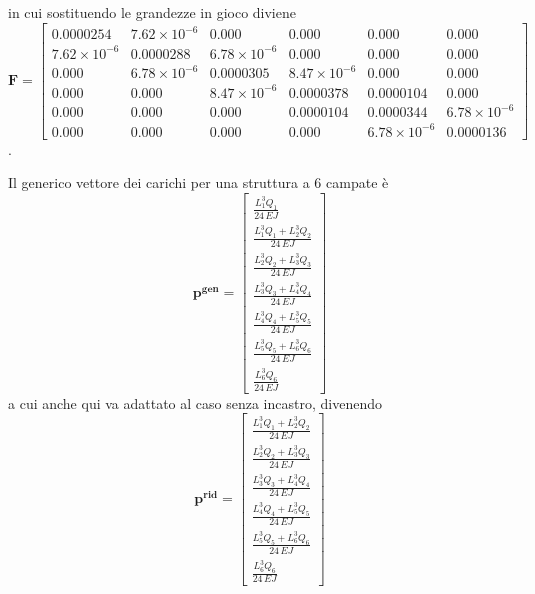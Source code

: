 in cui sostituendo le grandezze in gioco diviene
\begin{equation}
\mathbf{F}=
\begin{bmatrix}
0.0000254 & 7.62 \times 10^{-6} & 0.000 & 0.000 & 0.000 & 0.000 \\
7.62 \times 10^{-6} & 0.0000288 & 6.78 \times 10^{-6} & 0.000 & 0.000 & 0.000 \\
0.000 & 6.78 \times 10^{-6} & 0.0000305 & 8.47 \times 10^{-6} & 0.000 & 0.000 \\
0.000 & 0.000 & 8.47 \times 10^{-6} & 0.0000378 & 0.0000104 & 0.000 \\
0.000 & 0.000 & 0.000 & 0.0000104 & 0.0000344 & 6.78 \times 10^{-6} \\
0.000 & 0.000 & 0.000 & 0.000 & 6.78 \times 10^{-6} & 0.0000136
\end{bmatrix}
\end{equation}.

Il generico vettore dei carichi per una struttura a 6 campate è
\begin{equation}
\mathbf{p^{gen}}=
\begin{bmatrix}
\frac{L_{1}^{3} Q_{1}}{24 \, \mathit{EJ}} \\
\frac{L_{1}^{3} Q_{1} + L_{2}^{3} Q_{2}}{24 \, \mathit{EJ}} \\
\frac{L_{2}^{3} Q_{2} + L_{3}^{3} Q_{3}}{24 \, \mathit{EJ}} \\
\frac{L_{3}^{3} Q_{3} + L_{4}^{3} Q_{4}}{24 \, \mathit{EJ}} \\
\frac{L_{4}^{3} Q_{4} + L_{5}^{3} Q_{5}}{24 \, \mathit{EJ}} \\
\frac{L_{5}^{3} Q_{5} + L_{6}^{3} Q_{6}}{24 \, \mathit{EJ}} \\
\frac{L_{6}^{3} Q_{6}}{24 \, \mathit{EJ}}
\end{bmatrix}
\end{equation}
a cui anche qui va adattato al caso senza incastro, divenendo
\begin{equation}
\mathbf{p^{rid}}=
\begin{bmatrix}
\frac{L_{1}^{3} Q_{1} + L_{2}^{3} Q_{2}}{24 \, \mathit{EJ}} \\
\frac{L_{2}^{3} Q_{2} + L_{3}^{3} Q_{3}}{24 \, \mathit{EJ}} \\
\frac{L_{3}^{3} Q_{3} + L_{4}^{3} Q_{4}}{24 \, \mathit{EJ}} \\
\frac{L_{4}^{3} Q_{4} + L_{5}^{3} Q_{5}}{24 \, \mathit{EJ}} \\
\frac{L_{5}^{3} Q_{5} + L_{6}^{3} Q_{6}}{24 \, \mathit{EJ}} \\
\frac{L_{6}^{3} Q_{6}}{24 \, \mathit{EJ}}
\end{bmatrix}
\end{equation}

